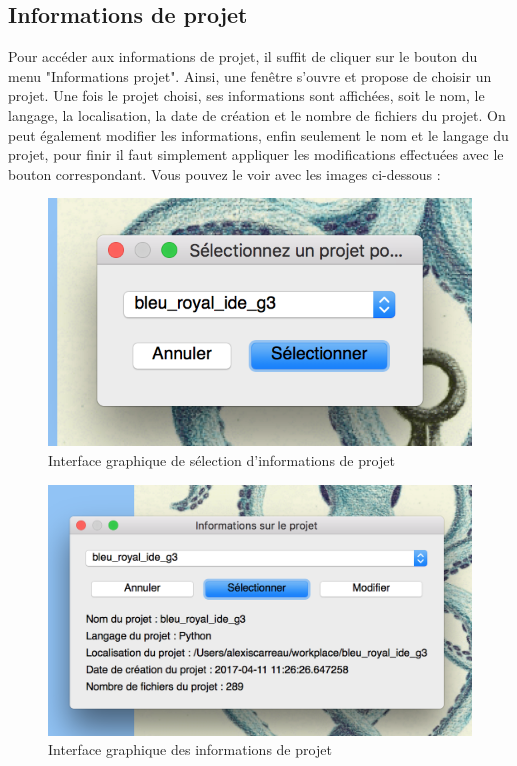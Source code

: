 \documentclass[a4paper,12pt]{article}
\begin{document}
\subsection{Informations de projet}

Pour accéder aux informations de projet, il suffit de cliquer sur le bouton du menu "Informations projet". Ainsi, une fenêtre s'ouvre et propose de choisir un projet. Une fois le projet choisi, ses informations sont affichées, soit le nom, le langage, la localisation, la date de création et le nombre de fichiers du projet. On peut également modifier les informations, enfin seulement le nom et le langage du projet, pour finir il faut simplement appliquer les modifications effectuées avec le bouton correspondant. Vous pouvez le voir avec les images ci-dessous :

\begin{figure}[h!]
			\begin{center}
				\includegraphics[scale=0.5]{images/imgs_projet/info_project1.png}
				\caption{Interface graphique de sélection d'informations de projet}
			\end{center}
		\end{figure}
		
\begin{figure}[h!]
			\begin{center}
				\includegraphics[scale=0.5]{images/imgs_projet/info_project2.png}
				\caption{Interface graphique des informations de projet}
			\end{center}
		\end{figure}
		
\end{document}
